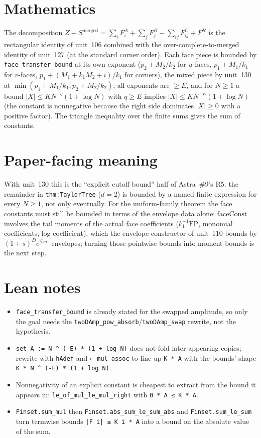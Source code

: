 \documentclass[11pt]{article}
\begin{document}
\section{Mathematics}

The decomposition $Z-S^{\mathrm{merged}}=\sum_iF^A_i+\sum_jF^B_j-\sum_{ij}F^C_{ij}+F^R$ is the
rectangular identity of unit~106 combined with the over-complete-to-merged identity of unit~127
(at the standard corner order). Each face piece is bounded by \texttt{face\_transfer\_bound} at its
own exponent ($p_2+M_2/k_2$ for $u$-faces, $p_1+M_1/k_1$ for $v$-faces,
$p_1+(M_1+k_1M_2+i)/k_1$ for corners), the mixed piece by unit~130 at
$\min(p_1+M_1/k_1,p_2+M_2/k_2)$; all exponents are $\ge E$, and for $N\ge1$ a bound
$|X|\le KN^{-q}(1+\log N)$ with $q\ge E$ implies $|X|\le KN^{-E}(1+\log N)$ (the constant is
nonnegative because the right side dominates $|X|\ge0$ with a positive factor). The triangle
inequality over the finite sums gives the sum of constants.

\section{Paper-facing meaning}

With unit~130 this is the ``explicit cutoff bound'' half of Astra~\#9's R5: the remainder in
\texttt{thm:TaylorTree} ($d=2$) is bounded by a named finite expression for every $N\ge1$, not only
eventually. For the uniform-family theorem the face constants must still be bounded in terms of the
envelope data alone: $\mathrm{faceConst}$ involves the tail moments of the actual face
coefficients ($k_1^{-1}\mathrm{FP}$, monomial coefficients, log coefficient), which the envelope
constructor of unit~110 bounds by $(1+s)^De^{\beta sa'}$ envelopes; turning those pointwise bounds
into moment bounds is the next step.

\section{Lean notes}

\begin{itemize}
\item \texttt{face\_transfer\_bound} is already stated for the swapped amplitude, so only the goal
needs the \texttt{twoDAmp\_pow\_absorb}/\texttt{twoDAmp\_swap} rewrite, not the hypothesis.
\item \texttt{set A := N \^{} (-E) * (1 + log N)} does not fold later-appearing copies; rewrite
with \texttt{hAdef} and \texttt{← mul\_assoc} to line up \texttt{K * A} with the bounds' shape
\texttt{K * N \^{} (-E) * (1 + log N)}.
\item Nonnegativity of an explicit constant is cheapest to extract from the bound it appears in:
\texttt{le\_of\_mul\_le\_mul\_right} with \texttt{0 * A ≤ K * A}.
\item \texttt{Finset.sum\_mul} then \texttt{Finset.abs\_sum\_le\_sum\_abs} and
\texttt{Finset.sum\_le\_sum} turn termwise bounds \texttt{|F i| ≤ K i * A} into a bound on the
absolute value of the sum.
\end{itemize}
\end{document}
